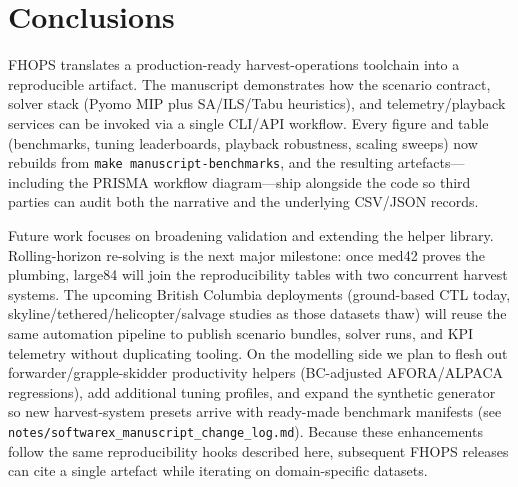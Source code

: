 \section{Conclusions}
\label{sec:conclusions}

FHOPS translates a production-ready harvest-operations toolchain into a reproducible artifact. The manuscript demonstrates how the scenario contract, solver stack (Pyomo MIP plus SA/ILS/Tabu heuristics), and telemetry/playback services can be invoked via a single CLI/API workflow. Every figure and table (benchmarks, tuning leaderboards, playback robustness, scaling sweeps) now rebuilds from \texttt{make manuscript-benchmarks}, and the resulting artefacts—including the PRISMA workflow diagram—ship alongside the code so third parties can audit both the narrative and the underlying CSV/JSON records.

Future work focuses on broadening validation and extending the helper library. Rolling-horizon re-solving is the next major milestone: once med42 proves the plumbing, large84 will join the reproducibility tables with two concurrent harvest systems. The upcoming British Columbia deployments (ground-based CTL today, skyline/tethered/helicopter/salvage studies as those datasets thaw) will reuse the same automation pipeline to publish scenario bundles, solver runs, and KPI telemetry without duplicating tooling. On the modelling side we plan to flesh out forwarder/grapple-skidder productivity helpers (BC-adjusted AFORA/ALPACA regressions), add additional tuning profiles, and expand the synthetic generator so new harvest-system presets arrive with ready-made benchmark manifests (see \texttt{notes/softwarex\_manuscript\_change\_log.md}). Because these enhancements follow the same reproducibility hooks described here, subsequent FHOPS releases can cite a single artefact while iterating on domain-specific datasets.

